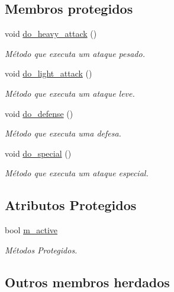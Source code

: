 \subsection*{Membros protegidos}
\begin{DoxyCompactItemize}
\item 
void \mbox{\hyperlink{classInfiltrator_a371e7c14076375ea21304220e826e5e0}{do\+\_\+heavy\+\_\+attack}} ()
\begin{DoxyCompactList}\small\item\em Método que executa um ataque pesado. \end{DoxyCompactList}\item 
void \mbox{\hyperlink{classInfiltrator_a70b8134dac23d716f86139da77cd8927}{do\+\_\+light\+\_\+attack}} ()
\begin{DoxyCompactList}\small\item\em Método que executa um ataque leve. \end{DoxyCompactList}\item 
void \mbox{\hyperlink{classInfiltrator_afc1de0dd263b72b5be1da33f6cd9bbe7}{do\+\_\+defense}} ()
\begin{DoxyCompactList}\small\item\em Método que executa uma defesa. \end{DoxyCompactList}\item 
void \mbox{\hyperlink{classInfiltrator_ad8cbafc64c00e7e5617baccdbda80746}{do\+\_\+special}} ()
\begin{DoxyCompactList}\small\item\em Método que executa um ataque especial. \end{DoxyCompactList}\end{DoxyCompactItemize}
\subsection*{Atributos Protegidos}
\begin{DoxyCompactItemize}
\item 
bool \mbox{\hyperlink{classInfiltrator_a57568f6f782efc405e959e5bfffc8163}{m\+\_\+active}}
\begin{DoxyCompactList}\small\item\em Métodos Protegidos. \end{DoxyCompactList}\end{DoxyCompactItemize}
\subsection*{Outros membros herdados}


